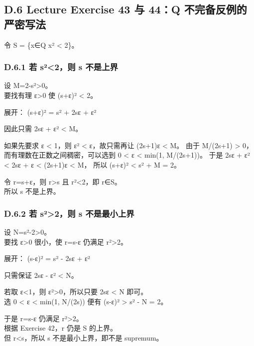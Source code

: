 \documentclass[
  11pt,
]{article}
\begin{document}
\subsection{D.6 Lecture Exercise 43 与 44：Q
不完备反例的严密写法}\label{d.6-lecture-exercise-43-ux4e0e-44q-ux4e0dux5b8cux5907ux53cdux4f8bux7684ux4e25ux5bc6ux5199ux6cd5}

令 S = \{x∈Q \textbar{} x² \textless{} 2\}。

\subsubsection{D.6.1 若 s²\textless2，则 s
不是上界}\label{d.6.1-ux82e5-suxb22ux5219-s-ux4e0dux662fux4e0aux754c}

设 M=2-s²\textgreater0。\\
要找有理 ε\textgreater0 使 (s+ε)² \textless{} 2。

展开： (s+ε)² = s² + 2sε + ε²

因此只需 2sε + ε² \textless{} M。

如果先要求 ε \textless{} 1，则 ε² \textless{} ε，故只需再让 (2s+1)ε
\textless{} M。 由于 M/(2s+1) \textgreater{}
0，而有理数在正数之间稠密，可以选到 0 \textless{} ε \textless{} min(1,
M/(2s+1))。 于是 2sε + ε² \textless{} 2sε + ε \textless{} (2s+1)ε
\textless{} M， 所以 (s+ε)² \textless{} s² + M = 2。

令 r=s+ε，则 r\textgreater s 且 r²\textless2，即 r∈S。\\
所以 s 不是上界。

\subsubsection{D.6.2 若 s²\textgreater2，则 s
不是最小上界}\label{d.6.2-ux82e5-suxb22ux5219-s-ux4e0dux662fux6700ux5c0fux4e0aux754c}

设 N=s²-2\textgreater0。\\
要找 ε\textgreater0 很小，使 r=s-ε 仍满足 r²\textgreater2。

展开： (s-ε)² = s² - 2sε + ε²

只需保证 2sε - ε² \textless{} N。

若取 ε\textless1，则 ε²\textgreater0，所以只要 2sε \textless{} N
即可。\\
选 0 \textless{} ε \textless{} min(1, N/(2s)) 便有 (s-ε)² \textgreater{}
s² - N = 2。

于是 r=s-ε 仍满足 r²\textgreater2。\\
根据 Exercise 42，r 仍是 S 的上界。\\
但 r\textless s，所以 s 不是最小上界，即不是 supremum。
\end{document}
